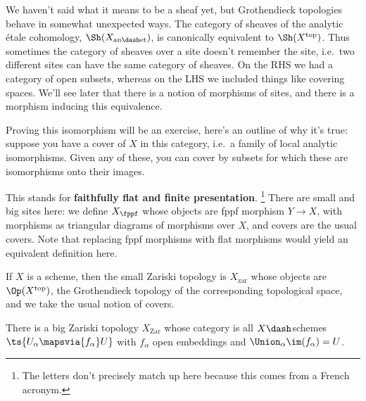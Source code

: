 \begin{remark}

We haven't said what it means to be a sheaf yet, but Grothendieck
topologies behave in somewhat unexpected ways. The category of sheaves
of the analytic étale cohomology, \(\Sh(X_{\mathrm{an\dash et}})\), is
canonically equivalent to \(\Sh(X^{\mathrm{top}})\). Thus sometimes the
category of sheaves over a site doesn't remember the site, i.e.~two
different sites can have the same category of sheaves. On the RHS we had
a category of open subsets, whereas on the LHS we included things like
covering spaces. We'll see later that there is a notion of morphisms of
sites, and there is a morphism inducing this equivalence.

Proving this isomorphism will be an exercise, here's an outline of why
it's true: suppose you have a cover of \(X\) in this category, i.e.~a
family of local analytic isomorphisms. Given any of these, you can cover
by subsets for which these are isomorphisms onto their images.

\end{remark}

\begin{example}

This stands for \textbf{faithfully flat and finite presentation}.
\footnote{The letters don't precisely match up here because this comes
  from a French acronym.} There are small and big sites here: we define
\(X_{\fppf}\) whose objects are fppf morphism \(Y\to X\), with morphisms
as triangular diagrams of morphisms over \(X\), and covers are the usual
covers. Note that replacing fppf morphisms with flat morphisms would
yield an equivalent definition here.

\end{example}

\begin{example}[?]

If \(X\) is a scheme, then the small Zariski topology is
\(X_{\mathrm{zar}}\) whose objects are \(\Op(X^{\mathrm{top}})\), the
Grothendieck topology of the corresponding topological space, and we
take the usual notion of covers.

There is a big Zariski topology \(X_{\mathrm{Zar}}\) whose category is
all \(X\dash\)schemes \(\ts{U_\alpha\mapsvia{f_\alpha} U}\) with
\(f_\alpha\) open embeddings and \(\Union_\alpha \im(f_\alpha) = U\).

\end{example}


